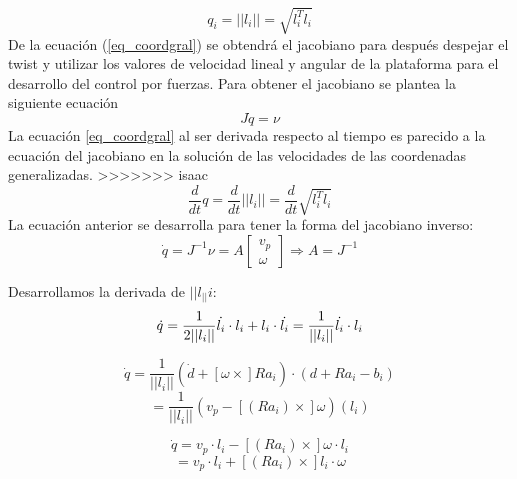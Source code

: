 \begin{equation}\label{eq_coordgral}
q_i = ||l_i|| = \sqrt{l_i^Tl_i}
\end{equation}
De la ecuación (\ref{eq_coordgral}) se obtendrá el jacobiano para después despejar el twist y utilizar los valores de velocidad lineal y angular de la plataforma para el desarrollo del control por fuerzas. Para obtener el jacobiano se plantea la siguiente ecuación
\begin{equation} \label{equgral_q}
J\dot{q}=\nu
\end{equation}
La ecuación \ref{eq_coordgral} al ser derivada respecto al tiempo es parecido a la ecuación del jacobiano en la solución de las velocidades de las coordenadas generalizadas.
>>>>>>> isaac
\begin{equation}
\frac{d}{dt}q = \frac{d}{dt}||l_i|| = \frac{d}{dt}\sqrt{l_i^Tl_i} 
\end{equation}
La ecuación anterior se desarrolla para tener la forma del jacobiano inverso:
\begin{equation}
\dot{q}=J^{-1} \nu = A \begin{bmatrix}
v_p\\
\omega
\end{bmatrix} \Rightarrow A = J^{-1}
\end{equation}

Desarrollamos la derivada de $||l_||i$:
\begin{equation}
\dot{q} = \frac{1}{2||l_i||} \dot{l_i} \cdot l_i + l_i \cdot \dot{l_i} = \frac{1}{||l_i||} \dot{l_i} \cdot l_i \\ \bigskip
\end{equation}

\begin{equation}
\dot{q}=\frac{1}{||l_i||}(\dot{d} + [\omega \times] Ra_i)\cdot(d + Ra_i -b_i) 
\end{equation}
\begin{equation*}
= \frac{1}{||l_i||}(v_p - [(Ra_i)\times]\omega)(l_i)
\end{equation*}

\begin{equation}
\dot{q} = v_p \cdot l_i - [(Ra_i)\times]\omega \cdot l_i 
\end{equation}
\begin{equation*}
= v_p \cdot l_i + [(Ra_i)\times]l_i \cdot \omega
\end{equation*}

